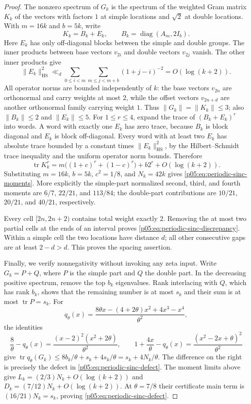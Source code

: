 \documentclass[11pt,letterpaper]{article}
\theoremstyle{definition}
\theoremstyle{remark}
\newcommand{\1}{\mathbf 1}
\begin{document}
\begin{proof}
The nonzero spectrum of $G_k$ is the spectrum of the weighted
Gram matrix $K_k$ of the vectors with factors $1$ at simple
locations and $\sqrt2$ at double locations.  With $m=16k$ and
$b=5k$, write
\[
 K_k=B_k+E_k,\qquad B_k=\operatorname{diag}(A_m,2I_b).
\]
Here $E_k$ has only off-diagonal blocks between the simple and
double groups.  The inner products between base vectors $v_{2i}$
and double vectors $v_{2j}$ vanish.  The other inner products give
\[
 \|E_k\|_{\mathrm{HS}}^2
 \ll_d\sum_{0\le i<m}\sum_{m\le j<m+b}
               (1+j-i)^{-2}
 =O(\log(k+2)).
\]
All operator norms are bounded independently of $k$: the base
vectors $v_{2n}$ are orthonormal and carry weights at most $2$,
while the offset vectors $v_{2n+d}$ are another orthonormal
family carrying weight $1$.  Thus $\|G_k\|=\|K_k\|\le3$;
also $\|B_k\|\le2$ and $\|E_k\|\le5$.
For $1\le r\le4$, expand the trace of $(B_k+E_k)^r$ into words.
A word with exactly one $E_k$ has zero trace, because $B_k$ is
block diagonal and $E_k$ is block off-diagonal.  Every word with
at least two $E_k$ has absolute trace bounded by a constant times
$\|E_k\|_{\mathrm{HS}}^2$, by the Hilbert--Schmidt trace
inequality and the uniform operator norm bounds.  Therefore
\[
 \operatorname{tr}K_k^r
 =m\bigl((1+c)^r+(1-c)^r\bigr)+b2^r
       +O(\log(k+2)).
\]
Substituting $m=16k$, $b=5k$, $c^2=1/8$, and $N_k=42k$
gives \eqref{p05:eq:periodic-sinc-moments}.  More explicitly the
simple-part normalized second, third, and fourth moments are
$6/7$, $22/21$, and $113/84$; the double-part contributions are
$10/21$, $20/21$, and $40/21$, respectively.

Every cell $[2n,2n+2)$ contains total weight exactly $2$.
Removing the at most two partial cells at the ends of an interval
proves \eqref{p05:eq:periodic-sinc-discrepancy}.  Within a simple cell
the two locations have distance $d$; all other consecutive gaps
are at least $2-d>d$.  This proves the spacing assertion.

Finally, we verify nonnegativity without invoking any zeta input.
Write $G_k=P+Q$, where $P$ is the simple part and $Q$ the double
part.  In the decreasing positive spectrum, remove the top $b_k$
eigenvalues.  Rank interlacing with $Q$, which has rank $b_k$,
shows that the remaining number is at most $s_k$ and their sum
is at most $\operatorname{tr}P=s_k$.  For
\[
 q_\theta(x)=
 \frac{8\theta x-(4+2\theta)x^2+4x^3-x^4}{\theta^2},
\]
the identities
\[
 \frac8\theta-q_\theta(x)
 =\frac{(x-2)^2(x^2+2\theta)}{\theta^2},\qquad
 1+\frac{4x}\theta-q_\theta(x)
 =\frac{(x^2-2x+\theta)^2}{\theta^2}
\]
give
$\operatorname{tr}q_\theta(G_k)
\le8b_k/\theta+s_k+4s_k/\theta
=s_k+4N_k/\theta$.
The difference on the right is precisely the defect in
\eqref{p05:eq:periodic-sinc-defect}.
The moment limits above give
$L_k=(2/3)N_k+O(\log(k+2))$ and
$D_k=(7/12)N_k+O(\log(k+2))$.
At $\theta=7/8$ their certificate main term is
$(16/21)N_k=s_k$, proving \eqref{p05:eq:periodic-sinc-defect}.
\end{proof}
\end{document}
